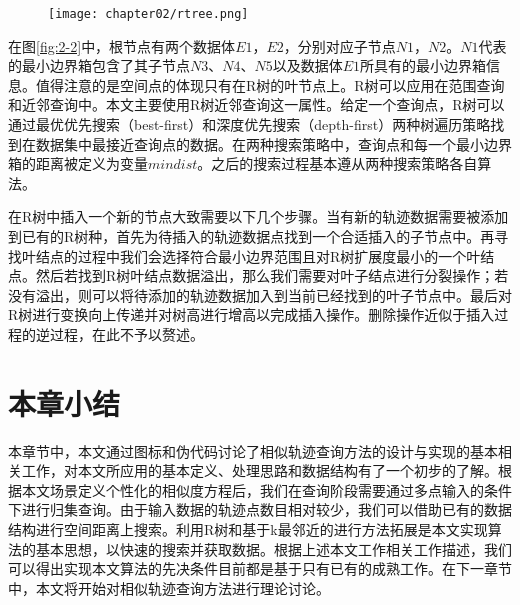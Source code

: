 \begin{figure}[!htp]
  \centering
  \texttt{[image: chapter02/rtree.png]}
\end{figure}

在图\ref{fig:2-2}中，根节点有两个数据体$E1$，$E2$，分别对应子节点$N1$，$N2$。$N1$代表的最小边界箱包含了其子节点$N3$、$N4$、$N5$以及数据体$E1$所具有的最小边界箱信息。值得注意的是空间点的体现只有在R树的叶节点上。R树可以应用在范围查询和近邻查询中。本文主要使用R树近邻查询这一属性。给定一个查询点，R树可以通过最优优先搜索（best-first）和深度优先搜索（depth-first）两种树遍历策略找到在数据集中最接近查询点的数据。在两种搜索策略中，查询点和每一个最小边界箱的距离被定义为变量$mindist$。之后的搜索过程基本遵从两种搜索策略各自算法。

在R树中插入一个新的节点大致需要以下几个步骤。当有新的轨迹数据需要被添加到已有的R树种，首先为待插入的轨迹数据点找到一个合适插入的子节点中。再寻找叶结点的过程中我们会选择符合最小边界范围且对R树扩展度最小的一个叶结点。然后若找到R树叶结点数据溢出，那么我们需要对叶子结点进行分裂操作；若没有溢出，则可以将待添加的轨迹数据加入到当前已经找到的叶子节点中。最后对R树进行变换向上传递并对树高进行增高以完成插入操作。删除操作近似于插入过程的逆过程，在此不予以赘述。
\\

\section{本章小结}
\label{sec:conclusion2}
本章节中，本文通过图标和伪代码讨论了相似轨迹查询方法的设计与实现的基本相关工作，对本文所应用的基本定义、处理思路和数据结构有了一个初步的了解。根据本文场景定义个性化的相似度方程后，我们在查询阶段需要通过多点输入的条件下进行归集查询。由于输入数据的轨迹点数目相对较少，我们可以借助已有的数据结构进行空间距离上搜索。利用R树和基于k最邻近的进行方法拓展是本文实现算法的基本思想，以快速的搜索并获取数据。根据上述本文工作相关工作描述，我们可以得出实现本文算法的先决条件目前都是基于只有已有的成熟工作。在下一章节中，本文将开始对相似轨迹查询方法进行理论讨论。